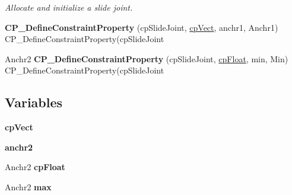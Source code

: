 \begin{DoxyCompactItemize}
\begin{DoxyCompactList}\small\item\em Allocate and initialize a slide joint. \end{DoxyCompactList}\item 
\hypertarget{group__cp_slide_joint_gabba9eeabe3d2a43686f1759f53a58715}{{\bfseries C\-P\-\_\-\-Define\-Constraint\-Property} (cp\-Slide\-Joint, \hyperlink{structcp_vect}{cp\-Vect}, anchr1, Anchr1) C\-P\-\_\-\-Define\-Constraint\-Property(cp\-Slide\-Joint}\label{group__cp_slide_joint_gabba9eeabe3d2a43686f1759f53a58715}

\item 
\hypertarget{group__cp_slide_joint_gadda06d3405f942386ab7855b79b1604b}{Anchr2 {\bfseries C\-P\-\_\-\-Define\-Constraint\-Property} (cp\-Slide\-Joint, \hyperlink{group__basic_types_gac1ed65573e035bf892505768c852d8d3}{cp\-Float}, min, Min) C\-P\-\_\-\-Define\-Constraint\-Property(cp\-Slide\-Joint}\label{group__cp_slide_joint_gadda06d3405f942386ab7855b79b1604b}

\end{DoxyCompactItemize}
\subsection*{Variables}
\begin{DoxyCompactItemize}
\item 
\hypertarget{group__cp_slide_joint_gae5bb48004c89589d2d4b8008db38754e}{{\bfseries cp\-Vect}}\label{group__cp_slide_joint_gae5bb48004c89589d2d4b8008db38754e}

\item 
\hypertarget{group__cp_slide_joint_gaed362236d55092056b72ea837860308b}{{\bfseries anchr2}}\label{group__cp_slide_joint_gaed362236d55092056b72ea837860308b}

\item 
\hypertarget{group__cp_slide_joint_ga5f57e6b0ab08a954e9c313bcb2a59732}{Anchr2 {\bfseries cp\-Float}}\label{group__cp_slide_joint_ga5f57e6b0ab08a954e9c313bcb2a59732}

\item 
\hypertarget{group__cp_slide_joint_gad0de5de596112c3929debd71ddc34b2d}{Anchr2 {\bfseries max}}\label{group__cp_slide_joint_gad0de5de596112c3929debd71ddc34b2d}

\end{DoxyCompactItemize}
